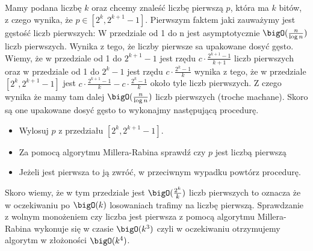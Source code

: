 Mamy podana liczbę $k$ oraz chcemy znaleść liczbę pierwszą $p$, która ma $k$ bitów, z czego wynika, że $p \in [2^k,2^{k+1}-1]$.
\newline \newline
Pierwszym faktem jaki zauważymy jest gęstość liczb pierwszych:\newline
W przedziale od 1 do n jest asymptotycznie $\bigO(\frac{n}{\log n})$ liczb pierwszych. 
\newline
Wynika z tego, że liczby pierwsze sa upakowane dosyć gęsto. Wiemy, że w przedziale od 1 do $2^{k+1} - 1$ jest rzędu $c\cdot \frac{2^{k+1}-1}{k+1}$ liczb pierwszych oraz w przedziale od 1 do $2^{k} - 1$ jest rzędu $c\cdot \frac{2^{k}-1}{k}$ wynika z tego, że w przedziale $[2^k,2^{k+1}-1]$ jest $c\cdot \frac{2^{k+1}-1}{k} - c\cdot \frac{2^{k}-1}{k}$ około tyle liczb pierwszych. Z czego wynika że mamy tam dalej $\bigO(\frac{n}{\log n})$ liczb pierwszych (troche machane).
\newline
\newline
Skoro są one upakowane dosyć gęsto to wykonajmy następującą procedurę.
\begin{itemize}
    \item Wylosuj $p$ z przedziału $[2^k,2^{k+1}-1]$.
    \item Za pomocą algorytmu Millera-Rabina sprawdź czy $p$ jest liczbą pierwszą
    \item Jeżeli jest pierwsza to ją zwróć, w przeciwnym wypadku powtórz procedurę.
\end{itemize}

Skoro wiemy, że w tym przedziale jest $\bigO(\frac{2^k}{k})$ liczb pierwszych to oznacza że w oczekiwaniu po $\bigO(k)$ losowaniach trafimy na liczbę pierwszą. Sprawdzanie z wolnym monożeniem czy liczba jest pierwsza z pomocą algorytmu Millera-Rabina wykonuje się w czasie $\bigO(k^3)$ czyli w oczekiwaniu otrzymujemy algorytm w złożoności $\bigO(k^4)$.